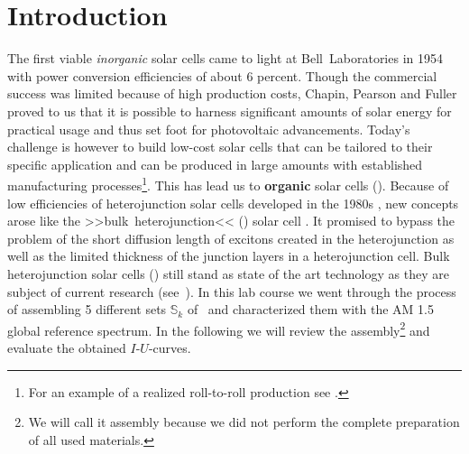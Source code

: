 
\section*{Introduction}%

The first viable \textit{inorganic} solar cells came to light at Bell~Laboratories in 1954 \cite{siliconSC_1}\cite{siliconSC_2} with power conversion efficiencies of about 6 percent. Though the commercial success was limited because of high production costs, Chapin, Pearson and Fuller proved to us that it is possible to harness significant amounts of solar energy for practical usage and thus set foot for photovoltaic advancements.\mypar
Today's challenge is however to build low-cost solar cells that can be tailored to their specific application and can be produced in large amounts with established manufacturing processes\footnote{For an example of a realized roll-to-roll production see \cite{rolltoroll}.}. This has lead us to \textbf{organic} solar cells (\OSC).\mypar
Because of low efficiencies of heterojunction solar cells developed in the 1980s \cite{tang}, new concepts arose like the >>bulk~heterojunction<< (\BHJ) solar cell \cite{heterojunk}. It promised to bypass the problem of the short diffusion length of excitons created in the heterojunction as well as the limited thickness of the junction layers in a heterojunction cell.\mypar
Bulk heterojunction solar cells (\BHSC) still stand as state of the art technology as they are subject of current research (see~\cite{modernbulkhetero}). In this lab course we went through the process of assembling 5 different sets $\mathbb{S}_k$ of \BHSC\ and characterized them with the {\os\sefo AM 1.5} global reference spectrum. In the following we will review the assembly\footnote{We will call it assembly because we did not perform the complete preparation of all used materials.} and evaluate the obtained $I$-$U$-curves.

